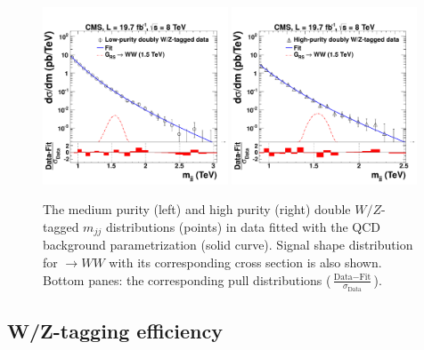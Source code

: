 \begin{figure}[th!b]
\begin{center}
\includegraphics[width=0.49\textwidth]{EXO-12-024/figs/MediumPuriVVFitAndPull.pdf}
\includegraphics[width=0.49\textwidth]{EXO-12-024/figs/HighPuriVVFitAndPull.pdf}
\end{center}
\caption{The medium purity (left) and high purity (right) double $W/Z$-tagged $m_{jj}$
  distributions (points) in data fitted with the QCD background parametrization (solid
  curve).  Signal shape distribution for
  \GRS$\to WW$ with its corresponding cross section is also shown.  Bottom panes:
  the corresponding pull distributions  ($\frac{\text{Data}-\text{Fit}}{\sigma_{\text{Data}}}$). 
  }
\label{fig:doubleVtagBG}
\end{figure}



\subsection{W/Z-tagging efficiency}
\label{sec:vtageff}

